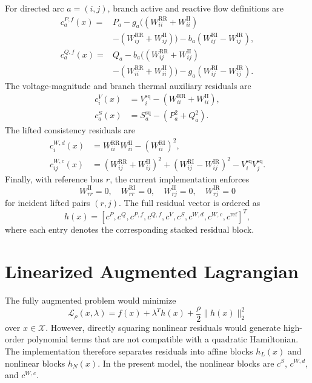 \documentclass[journal]{IEEEtran}
\newcommand{\RR}{\mathrm{RR}}
\newcommand{\RI}{\mathrm{RI}}
\newcommand{\IR}{\mathrm{IR}}
\newcommand{\II}{\mathrm{II}}
\newcommand{\sq}{\mathrm{sq}}
\begin{document}
For directed arc $a=(i,j)$, branch active and reactive flow definitions are
\begin{align}
c_a^{P,f}(x)={}&P_a-
g_a\bigl((W_{ii}^{\RR}+W_{ii}^{\II}) \nonumber\\
&-(W_{ij}^{\RR}+W_{ij}^{\II})\bigr)
-b_a(W_{ij}^{\RI}-W_{ij}^{\IR}),\\
c_a^{Q,f}(x)={}&Q_a-
b_a\bigl((W_{ij}^{\RR}+W_{ij}^{\II}) \nonumber\\
&-(W_{ii}^{\RR}+W_{ii}^{\II})\bigr)
-g_a(W_{ij}^{\RI}-W_{ij}^{\IR}).
\end{align}
The voltage-magnitude and branch thermal auxiliary residuals are
\begin{align}
c_i^V(x)&=V_i^{\sq}-(W_{ii}^{\RR}+W_{ii}^{\II}),\\
c_a^S(x)&=S_a^{\sq}-(P_a^2+Q_a^2).
\end{align}
The lifted consistency residuals are
\begin{align}
c_i^{W,d}(x)&=W_{ii}^{\RR}W_{ii}^{\II}-(W_{ii}^{\RI})^2,\\
c_{ij}^{W,c}(x)&=(W_{ij}^{\RR}+W_{ij}^{\II})^2
 +(W_{ij}^{\RI}-W_{ij}^{\IR})^2
 -V_i^{\sq}V_j^{\sq}.
\end{align}
Finally, with reference bus $r$, the current implementation enforces
\begin{equation}
    W_{rr}^{\II}=0,\quad W_{rr}^{\RI}=0,\quad
    W_{rj}^{\II}=0,\quad W_{rj}^{\IR}=0
\end{equation}
for incident lifted pairs $(r,j)$. The full residual vector is ordered as
\begin{equation}
h(x)=\left[
c^P,c^Q,c^{P,f},c^{Q,f},c^V,c^S,c^{W,d},c^{W,c},c^{\mathrm{ref}}
\right]^T,
\end{equation}
where each entry denotes the corresponding stacked residual block.

\section{Linearized Augmented Lagrangian}
The fully augmented problem would minimize
\begin{equation}
    \mathcal L_\rho(x,\lambda)=
    f(x)+\lambda^T h(x)+\frac{\rho}{2}\|h(x)\|_2^2
\end{equation}
over $x\in\mathcal X$. However, directly squaring nonlinear residuals would generate high-order polynomial terms that are not compatible with a quadratic Hamiltonian. The implementation therefore separates residuals into affine blocks $h_L(x)$ and nonlinear blocks $h_N(x)$. In the present model, the nonlinear blocks are $c^S$, $c^{W,d}$, and $c^{W,c}$.
\end{document}
